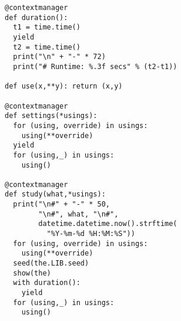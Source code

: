 \begin{lstlisting}
@contextmanager
def duration():
  t1 = time.time()
  yield
  t2 = time.time()
  print("\n" + "-" * 72)
  print("# Runtime: %.3f secs" % (t2-t1))

def use(x,**y): return (x,y)

@contextmanager
def settings(*usings):
  for (using, override) in usings:
    using(**override)
  yield
  for (using,_) in usings:
    using()
    
@contextmanager
def study(what,*usings):
  print("\n#" + "-" * 50,
        "\n#", what, "\n#",
        datetime.datetime.now().strftime(
          "%Y-%m-%d %H:%M:%S"))    
  for (using, override) in usings:
    using(**override)              
  seed(the.LIB.seed)            
  show(the)                   
  with duration():
    yield
  for (using,_) in usings:
    using()               
\end{lstlisting}

